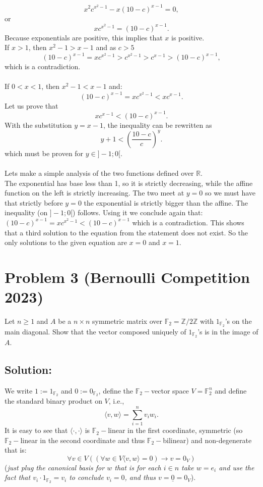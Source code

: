 \documentclass[11pt, a4paper, oneside]{article}
\newcommand{\problem}[1][]{\section{#1} \hfill \par}
\newcommand{\solution}[1][]{\subsection*{#1}\hfill \par}
\theoremstyle{remark}
\theoremstyle{lemma}
\begin{document}
\[
x^{2}c^{x^{2} - 1} - x(10 - c)^{x - 1} = 0,
\]
or
\[
x c^{x^{2} - 1} = (10 - c)^{x - 1}.
\]
Because exponentials are positive, this implies that \(x\) is positive.
\\
If \(x > 1\), then $x^2-1> x-1$ and as $c>5$
\[
(10 - c)^{x - 1}=x c^{x^{2} - 1} > c^{x^{2} - 1} > c^{x - 1} > (10 - c)^{x - 1},
\]
which is a contradiction.
\\\\
If \(0 < x < 1\), then $x^2-1<x-1$ and:
\[
(10-c)^{x-1}=x c^{x^{2} - 1} < x c^{x - 1}.
\]
Let us prove that
\[
x c^{x - 1} < (10 - c)^{x - 1}.
\]
With the substitution \(y = x - 1\), the inequality can be rewritten as
\[
y + 1 < \left(\frac{10 - c}{c}\right)^{y}.
\]
which must be proven for \(y \in ]-1;0[\).
\\\\
Lets make a simple analysis of the two functions defined over $\mathbb{R}$.\\
The exponential has base less than 1, so it is strictly decreasing, while the affine function on the left is strictly increasing. The two meet at \(y = 0\) so  we must have that strictly before $y=0$ the exponential is strictly bigger than the affine. The inequality (on $]-1;0[$) follows. Using it we conclude again that:
\((10 - c)^{x - 1}=x c^{x^{2} - 1}<(10 - c)^{x - 1}\) which is a contradiction. This shows that a third solution to the equation from the statement does not exist. So the only solutions to the given equation are \(x = 0\) and \(x = 1\).
\newpage
\problem[Problem 3 (Bernoulli Competition 2023)]
Let $n\geq 1$ and \( A \) be a $n\times n$ symmetric matrix over \( \mathbb{F}_2 = \mathbb{Z}/2\mathbb{Z} \) with \( 1_{\mathbb{F}_2} \)’s on the main diagonal. Show that the vector composed uniquely of $1_{\mathbb{F}_2}$'s is in the image of \( A \).
\solution[Solution:]
We write $1:=1_{\mathbb{F}_2}$ and $0:=0_{\mathbb{F}_2}$, define the $\mathbb{F}_{2}-$vector space $V=\mathbb{F}_2^n $ and define the standard binary product on \( V \), i.e.,
\[
\langle v, w \rangle = \sum_{i=1}^n v_i w_i.
\]
It is easy to see that $\langle \cdot, \cdot \rangle$ is $\mathbb{F}_{2}-$linear in the first coordinate, symmetric (so $\mathbb{F}_{2}-$linear in the second coordinate and thus $\mathbb{F}_{2}-$bilinear) and non-degenerate that is:
$$\forall v\in V\left(\left(\forall w\in V \langle v,w\rangle=0\right) \rightarrow v=0_V\right)$$
(\textit{just plug the canonical basis for $w$ that is for each $i\in n$ take $w=e_i$ and use the fact that $v_i\cdot 1_{\mathbb{F}_2}=v_i$ to conclude $v_i=0$, and thus $v=\underline{0}=0_V$}).
\end{document}
